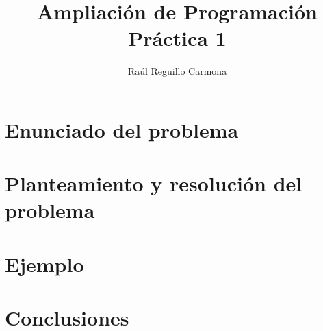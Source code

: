 \documentclass[titlepage,12pt]{article}
\title{Ampliaci\'on de Programaci\'on\\Pr\'actica 1}
\author{Ra\'ul Reguillo Carmona}
\date{}
\begin{document}
\maketitle
\newpage
\tableofcontents

\newpage

\listoffigures
\newpage

\section{Enunciado del problema}
\section{Planteamiento y resolución del problema}
\section{Ejemplo}
\section{Conclusiones}
\end{document}
